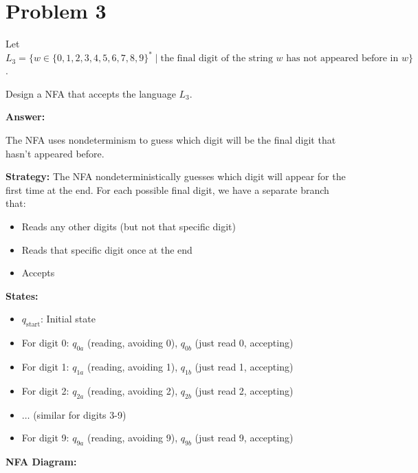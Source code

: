 \documentclass[12pt]{article}
\begin{document}
\newpage

\section*{Problem 3}
Let $L_3 = \{w \in \{0, 1, 2, 3, 4, 5, 6, 7, 8, 9\}^* \mid \text{the final digit of the string } w \text{ has not appeared before in } w\}$.

Design a NFA that accepts the language $L_3$.

\textbf{Answer:}

The NFA uses nondeterminism to guess which digit will be the final digit that hasn't appeared before.

\textbf{Strategy:}
The NFA nondeterministically guesses which digit will appear for the first time at the end. For each possible final digit, we have a separate branch that:
\begin{itemize}
    \item Reads any other digits (but not that specific digit)
    \item Reads that specific digit once at the end
    \item Accepts
\end{itemize}

\textbf{States:}
\begin{itemize}
    \item $q_{\text{start}}$: Initial state
    \item For digit 0: $q_{0a}$ (reading, avoiding 0), $q_{0b}$ (just read 0, accepting)
    \item For digit 1: $q_{1a}$ (reading, avoiding 1), $q_{1b}$ (just read 1, accepting)
    \item For digit 2: $q_{2a}$ (reading, avoiding 2), $q_{2b}$ (just read 2, accepting)
    \item $\ldots$ (similar for digits 3-9)
    \item For digit 9: $q_{9a}$ (reading, avoiding 9), $q_{9b}$ (just read 9, accepting)
\end{itemize}

\textbf{NFA Diagram:}
\end{document}
